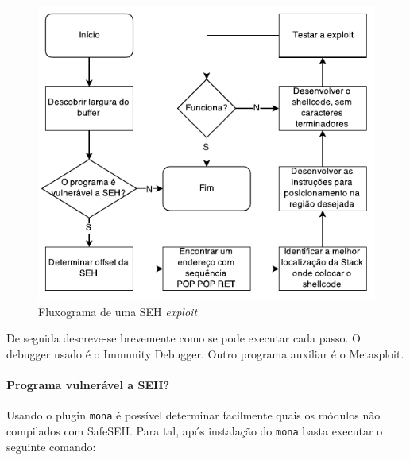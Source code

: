 \documentclass[a4paper]{article}
\begin{document}

\begin{figure}[h]
        \centering
        \includegraphics[width=0.7\linewidth]{fc1}
        \caption{Fluxograma de uma SEH \textit{exploit}}
        \label{fig:flowchart1}
\end{figure}
De seguida descreve-se brevemente como se pode executar cada passo. O debugger usado é o Immunity Debugger. Outro programa auxiliar é o Metasploit.

\paragraph*{Programa vulnerável a SEH?} Usando o plugin \texttt{mona} é possível determinar facilmente quais os módulos não compilados com SafeSEH. Para tal, após instalação do \texttt{mona} basta executar o seguinte comando:
\end{document}
